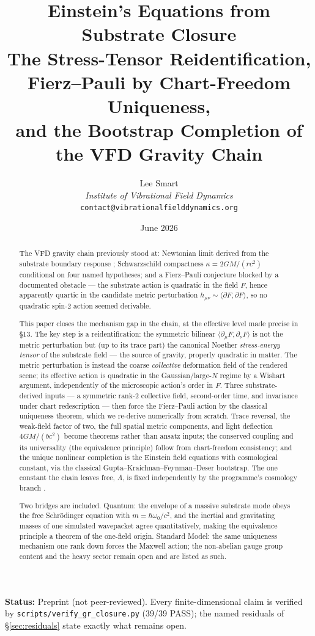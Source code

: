 \documentclass[12pt]{article}
\title{Einstein's Equations from Substrate Closure\\[6pt]
\large The Stress-Tensor Reidentification, Fierz--Pauli by Chart-Freedom Uniqueness,\\ and the Bootstrap Completion of the VFD Gravity Chain}
\author{Lee Smart\\ \textit{Institute of Vibrational Field Dynamics}\\ \texttt{contact@vibrationalfielddynamics.org}}
\date{June 2026}
\theoremstyle{definition}
\theoremstyle{remark}
\begin{document}
\maketitle

\noindent\textbf{Status:} Preprint (not peer-reviewed). Every finite-dimensional claim is verified by \texttt{scripts/verify\_gr\_closure.py} (39/39 PASS); the named residuals of \S\ref{sec:residuals} state exactly what remains open.

\begin{abstract}
The VFD gravity chain previously stood at: Newtonian limit derived from the substrate boundary response \citep{SmartKappa}; Schwarzschild compactness $\kappa = 2GM/(rc^2)$ conditional on four named hypotheses; and a Fierz--Pauli conjecture blocked by a documented obstacle --- the substrate action is quadratic in the field $F$, hence apparently quartic in the candidate metric perturbation $h_{\mu\nu} \sim \langle\partial F, \partial F\rangle$, so no quadratic spin-2 action seemed derivable.

This paper closes the mechanism gap in the chain, at the effective level made precise in \S13. The key step is a reidentification: the symmetric bilinear $\langle\partial_\mu F, \partial_\nu F\rangle$ is not the metric perturbation but (up to its trace part) the canonical Noether \emph{stress-energy tensor} of the substrate field --- the source of gravity, properly quadratic in matter. The metric perturbation is instead the coarse \emph{collective} deformation field of the rendered scene; its effective action is quadratic in the Gaussian/large-$N$ regime by a Wishart argument, independently of the microscopic action's order in $F$. Three substrate-derived inputs --- a symmetric rank-2 collective field, second-order time, and invariance under chart redescription --- then force the Fierz--Pauli action by the classical uniqueness theorem, which we re-derive numerically from scratch. Trace reversal, the weak-field factor of two, the full spatial metric components, and light deflection $4GM/(bc^2)$ become theorems rather than ansatz inputs; the conserved coupling and its universality (the equivalence principle) follow from chart-freedom consistency; and the unique nonlinear completion is the Einstein field equations with cosmological constant, via the classical Gupta--Kraichnan--Feynman--Deser bootstrap. The one constant the chain leaves free, $\Lambda$, is fixed independently by the programme's cosmology branch \citep{SmartL}.

Two bridges are included. Quantum: the envelope of a massive substrate mode obeys the free Schr\"odinger equation with $m = \hbar\omega_0/c^2$, and the inertial and gravitating masses of one simulated wavepacket agree quantitatively, making the equivalence principle a theorem of the one-field origin. Standard Model: the same uniqueness mechanism one rank down forces the Maxwell action; the non-abelian gauge group content and the heavy sector remain open and are listed as such.


\end{abstract}
\end{document}
